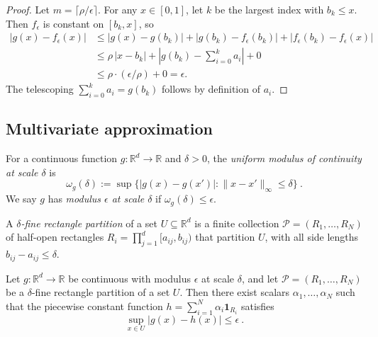\begin{proof}
  Let $m = \lceil \rho / \epsilon \rceil$.
  For any $x \in [0,1]$, let $k$ be the largest index with $b_k \le x$.
  Then $f_\epsilon$ is constant on $[b_k, x]$, so
  \begin{align*}
    |g(x) - f_\epsilon(x)|
    &\le |g(x) - g(b_k)| + |g(b_k) - f_\epsilon(b_k)| + |f_\epsilon(b_k) - f_\epsilon(x)| \\
    &\le \rho \, |x - b_k| + \left|g(b_k) - \sum_{i=0}^k a_i\right| + 0 \\
    &\le \rho \cdot (\epsilon / \rho) + 0 = \epsilon.
  \end{align*}
  The telescoping $\sum_{i=0}^k a_i = g(b_k)$ follows by definition of $a_i$.
\end{proof}

\subsection{Multivariate approximation}

\begin{definition}\label{def:modulusContinuity}
For a continuous function $g : \mathbb{R}^d \to \mathbb{R}$ and $\delta > 0$, the \emph{uniform modulus of continuity at scale $\delta$} is
\[
  \omega_g(\delta) := \sup \{ |g(x) - g(x')| : \|x - x'\|_\infty \le \delta \}
  \: .
\]
We say $g$ has \emph{modulus $\epsilon$ at scale $\delta$} if $\omega_g(\delta) \le \epsilon$.
\end{definition}

\begin{definition}\label{def:rectanglePartition}
A \emph{$\delta$-fine rectangle partition} of a set $U \subseteq \mathbb{R}^d$ is a finite collection $\mathcal{P} = (R_1, \ldots, R_N)$ of half-open rectangles $R_i = \prod_{j=1}^d [a_{ij}, b_{ij})$ that partition $U$, with all side lengths $b_{ij} - a_{ij} \le \delta$.
\end{definition}

\begin{lemma}\label{lem:piecewiseConst}
Let $g : \mathbb{R}^d \to \mathbb{R}$ be continuous with modulus $\epsilon$ at scale $\delta$, and let $\mathcal{P} = (R_1, \ldots, R_N)$ be a $\delta$-fine rectangle partition of a set $U$.
Then there exist scalars $\alpha_1, \ldots, \alpha_N$ such that the piecewise constant function $h = \sum_{i=1}^N \alpha_i \mathbf{1}_{R_i}$ satisfies
\[
  \sup_{x \in U} |g(x) - h(x)| \le \epsilon
  \: .
\]
\end{lemma}

